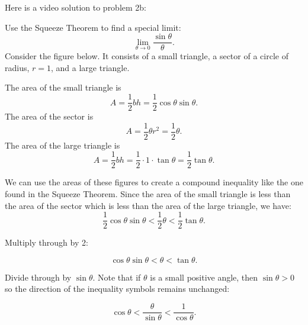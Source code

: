 \documentclass[handout]{ximera}
\begin{document}
Here is a video solution to problem 2b:
\begin{foldable}
\end{foldable}

\begin{example}[example 3]
Use the Squeeze Theorem to find a special limit: 
\[
\lim_{\theta \to 0} \frac{\sin \theta}{\theta}.
\]
Consider the figure below.  It consists of a small triangle, a sector of a circle of radius,  $r = 1$, and a large triangle.

\begin{image}
\end{image}







The area of the small triangle is 
\[
A = \frac12 bh = \frac12 \cos\theta \sin\theta.
\]
The area of the sector is 
\[
A = \frac12 \theta r^2 = \frac12 \theta.
\]
The area of the large triangle is 
\[
A = \frac12 bh = \frac12 \cdot 1 \cdot \tan\theta = \frac12 \tan\theta.
\]

We can use the areas of these figures to create a compound inequality like the one found in the Squeeze Theorem.
Since the area of the small triangle is less than the area of the sector which is less than the area of the large triangle, we have:
\[
\frac12 \cos\theta \sin\theta < \frac12 \theta < \frac12 \tan\theta.
\]

Multiply through by 2:

\[
\cos\theta \sin\theta < \theta < \tan\theta.
\]

Divide through by $\sin\theta$.  Note that if $\theta$ is a small positive angle, 
then $\sin\theta >0$ so the direction of the inequality symbols remains unchanged:

\[
\cos\theta  < \frac{ \theta}{\sin\theta} < \frac{1}{\cos\theta}.
\]


\end{example}
\end{document}
